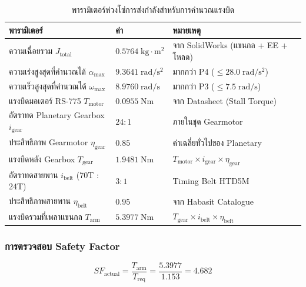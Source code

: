 \begin{table}[H]
  \centering
  \caption{พารามิเตอร์ห่วงโซ่การส่งกำลังสำหรับการคำนวณแรงบิด}
  \label{tab:torque_budget}
  \small
  \begin{tabular}{>{\raggedright\arraybackslash}p{5.5cm}
                  >{\centering\arraybackslash}p{3.0cm}
                  >{\raggedright\arraybackslash}p{5.0cm}}
    \toprule
    พารามิเตอร์ & ค่า & หมายเหตุ \\
    \midrule
    ความเฉื่อยรวม $J_{\mathrm{total}}$ & $0.5764\;\mathrm{kg \cdot m^2}$ & จาก SolidWorks (แขนกล + EE + โหลด) \\
    ความเร่งสูงสุดที่คำนวณได้ $\alpha_{\max}$ & $9.3641\;\mathrm{rad/s^2}$ & มากกว่า P4 ($\leq 28.0\;\mathrm{rad/s^2}$) \\
    ความเร็วสูงสุดที่คำนวณได้ $\omega_{\max}$ & $8.9760\;\mathrm{rad/s}$ & มากกว่า P3 ($\leq 7.5\;\mathrm{rad/s}$) \\
    แรงบิดมอเตอร์ RS-775 $T_{\mathrm{motor}}$ & $0.0955\;\mathrm{Nm}$ & จาก Datasheet (Stall Torque) \\
    อัตราทด Planetary Gearbox $i_{\mathrm{gear}}$ & $24{:}1$ & ภายในชุด Gearmotor \\
    ประสิทธิภาพ Gearmotor $\eta_{\mathrm{gear}}$ & $0.85$ & ค่าเฉลี่ยทั่วไปของ Planetary \\
    แรงบิดหลัง Gearbox $T_{\mathrm{gear}}$ & $1.9481\;\mathrm{Nm}$ & $T_{\mathrm{motor}} \times i_{\mathrm{gear}} \times \eta_{\mathrm{gear}}$ \\
    อัตราทดสายพาน $i_{\mathrm{belt}}$ (70T : 24T) & $3{:}1$ & Timing Belt HTD5M \\
    ประสิทธิภาพสายพาน $\eta_{\mathrm{belt}}$ & $0.95$ & จาก Habasit Catalogue \\
    แรงบิดรวมที่เพลาแขนกล $T_{\mathrm{arm}}$ & $5.3977\;\mathrm{Nm}$ & $T_{\mathrm{gear}} \times i_{\mathrm{belt}} \times \eta_{\mathrm{belt}}$ \\
    \bottomrule
  \end{tabular}
\end{table}

\subsubsection{การตรวจสอบ Safety Factor}

\begin{equation}
  SF_{\mathrm{actual}} = \frac{T_{\mathrm{arm}}}{T_{\mathrm{req}}}
  = \frac{5.3977}{1.153}
  = 4.682
  \label{eq:sf_actual}
\end{equation}

